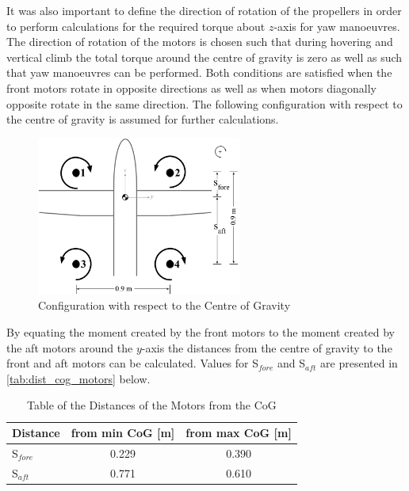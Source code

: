 It was also important to define the direction of rotation of the propellers in order to perform calculations for the required torque about $z$-axis for yaw manoeuvres. The direction of rotation of the motors is chosen such that during hovering and vertical climb the total torque around the centre of gravity is zero as well as such that yaw manoeuvres can be performed. Both conditions are satisfied when the front motors rotate in opposite directions as well as when motors diagonally opposite rotate in the same direction. The following configuration with respect to the centre of gravity is assumed for further calculations.

\begin{figure}[htb]
    \centering
    \includegraphics[width=0.6\textwidth]{StabilityandControl/Figures/Template_layout}
    \caption{Configuration with respect to the Centre of Gravity}
    \label{fig:layout}
\end{figure}

By equating the moment created by the front motors to the moment created by the aft motors around the $y$-axis the distances from the centre of gravity to the front and aft motors can be calculated. Values for S$_{fore}$ and S$_{aft}$ are presented in \autoref{tab:dist_cog_motors} below.

\begin{table}[H]
    \centering
    \caption{Table of the Distances of the Motors from the CoG}
    \begin{tabular}{lcc}
        \toprule
        \textbf{Distance} & \textbf{from min CoG [m]} & \textbf{from max CoG [m]} 
        \\ \midrule
        S$_{fore}$        & 0.229                     & 0.390
        \\ \hdashline
        S$_{aft}$         & 0.771                     & 0.610
        \\ \bottomrule
    \end{tabular}
    \label{tab:dist_cog_motors}
\end{table}

